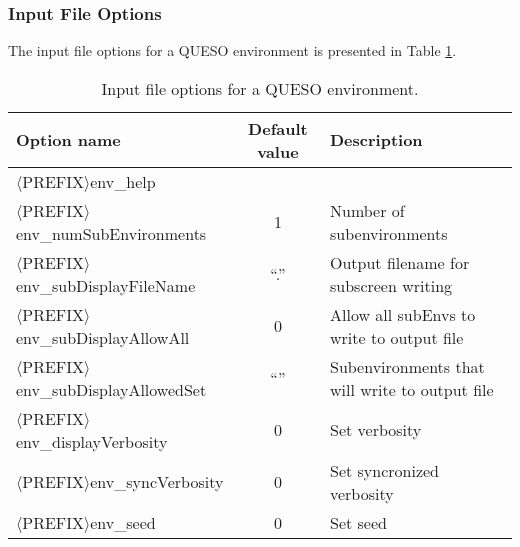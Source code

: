 \subsubsection{Input File Options}
The input file options for a QUESO environment is presented in Table \ref{tab-env-options}.
\begin{table}[htpb]
\begin{center}
\caption{Input file options for a QUESO environment.}\label{tab-env-options}

\begin{tabular}{l c  m{6cm}}
\toprule
Option name                      &  Default  value & Description \\
\midrule\midrule

\ttfamily $\langle$PREFIX$\rangle$env\_help                &         &             \\
\midrule
\ttfamily$\langle$PREFIX$\rangle$env\_numSubEnvironments   &   1     &  Number of subenvironments                \\ %
\midrule
\ttfamily$\langle$PREFIX$\rangle$env\_subDisplayFileName   &  ``.''  & Output filename for subscreen writing     \\ %
\midrule
\ttfamily$\langle$PREFIX$\rangle$env\_subDisplayAllowAll   &   0     & Allow all subEnvs to write to output file  \\ %
\midrule
\ttfamily$\langle$PREFIX$\rangle$env\_subDisplayAllowedSet & ``''    & Subenvironments that will write to output file      \\ %
\midrule
\ttfamily$\langle$PREFIX$\rangle$env\_displayVerbosity     &   0     & Set verbosity				           \\ %
\midrule
\ttfamily$\langle$PREFIX$\rangle$env\_syncVerbosity        &   0     & Set syncronized verbosity            \\ %
\midrule
\ttfamily$\langle$PREFIX$\rangle$env\_seed                 &   0     & Set seed           \\ %
%
\bottomrule
\end{tabular}
\end{center}
\end{table}

